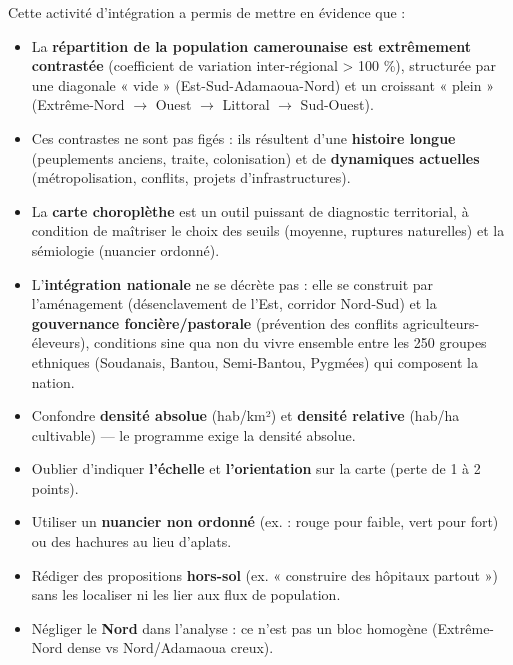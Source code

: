 \documentclass[11pt]{article}
\newcommand{\cle}[1]{{\popxbold\color{popdark}#1}}
\newcounter{popsec}
\newcounter{popsub}
\newcommand{\courssub}[1]{%
  \stepcounter{popsub}%
  \par\vspace{9pt}\noindent{\popxbold\fontsize{11.5}{13}\selectfont\color{popink}{\color{poporange}\thepopsec.\thepopsub}\hspace{6pt}#1}\par\nopagebreak\vspace{4pt}
}
\begin{document}
\courssub{Bilan de l'activité}
Cette activité d'intégration a permis de mettre en évidence que :
\begin{itemize}
    \item La \textbf{répartition de la population camerounaise est extrêmement contrastée} (coefficient de variation inter-régional > 100 \%), structurée par une diagonale « vide » (Est-Sud-Adamaoua-Nord) et un croissant « plein » (Extrême-Nord $\to$ Ouest $\to$ Littoral $\to$ Sud-Ouest).
    \item Ces contrastes ne sont pas figés : ils résultent d'une \textbf{histoire longue} (peuplements anciens, traite, colonisation) et de \textbf{dynamiques actuelles} (métropolisation, conflits, projets d'infrastructures).
    \item La \textbf{carte choroplèthe} est un outil puissant de diagnostic territorial, à condition de maîtriser le choix des seuils (moyenne, ruptures naturelles) et la sémiologie (nuancier ordonné).
    \item L'\textbf{intégration nationale} ne se décrète pas : elle se construit par l'aménagement (désenclavement de l'Est, corridor Nord-Sud) et la \textbf{gouvernance foncière/pastorale} (prévention des conflits agriculteurs-éleveurs), conditions sine qua non du \cle{vivre ensemble} entre les 250 groupes ethniques (Soudanais, Bantou, Semi-Bantou, Pygmées) qui composent la nation.
\end{itemize}

\begin{attention}
\begin{itemize}
    \item Confondre \textbf{densité absolue} (hab/km²) et \textbf{densité relative} (hab/ha cultivable) — le programme exige la densité absolue.
    \item Oublier d'indiquer \textbf{l'échelle} et \textbf{l'orientation} sur la carte (perte de 1 à 2 points).
    \item Utiliser un \textbf{nuancier non ordonné} (ex. : rouge pour faible, vert pour fort) ou des hachures au lieu d'aplats.
    \item Rédiger des propositions \textbf{hors-sol} (ex. « construire des hôpitaux partout ») sans les localiser ni les lier aux flux de population.
    \item Négliger le \textbf{Nord} dans l'analyse : ce n'est pas un bloc homogène (Extrême-Nord dense vs Nord/Adamaoua creux).
\end{itemize}
\end{attention}
\end{document}
